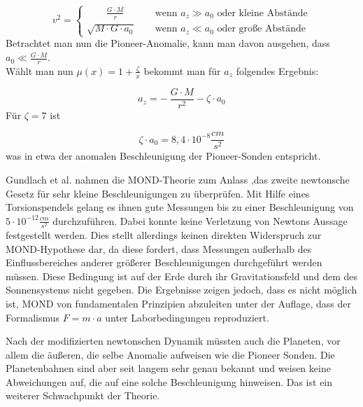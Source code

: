 \begin{equation*}
v^{2}=
\begin{cases}
\qquad \frac{G\cdot M}{r} \qquad \quad \, \textrm{wenn } a_{z}\gg a_{0} \textrm{ oder kleine Abst\"ande} \\
\sqrt{M\cdot G\cdot a_{0}} \qquad \textrm{wenn } a_{z}\ll a_{0} \textrm{ oder gro{\ss}e Abst\"ande}
\end{cases}
\end{equation*}
Betrachtet man nun die Pioneer-Anomalie, kann man davon
ausgehen, dass $a_{0}\ll \frac{G\cdot M}{r}$. \\
W\"ahlt man nun $\mu (x)=1+\frac{\zeta }{x}$ bekommt
man f\"ur $a_{z}$ folgendes Ergebnis:

\begin{equation}
a_{z}=-\ \frac{G\cdot M}{r^{2}}-\zeta \cdot a_{0}
\end{equation}
F\"ur $\zeta =7$ ist 

\begin{equation*}
\zeta \cdot a_{0}=8,4\cdot 10^{-8}\frac{\mathit{cm}}{s^{2}}
\end{equation*}
was in etwa der anomalen Beschleunigung der Pioneer-Sonden entspricht.


\bigskip


Gundlach et al.\cite{Grundlach2007} nahmen die MOND-Theorie zum Anlass ,das zweite
newtonsche Gesetz f\"ur sehr kleine Beschleunigungen zu \"uberpr\"ufen.
Mit Hilfe eines Torsionspendels gelang es ihnen gute Messungen bis zu
einer Beschleunigung von  $5\cdot 10^{-12}\frac{\mathit{cm}}{s^{2}}$
durchzuf\"uhren. Dabei konnte keine Verletzung von Newtons Aussage
festgestellt werden. Dies stellt allerdings keinen direkten Widerspruch
zur MOND-Hypothese dar, da diese fordert, dass Messungen au{\ss}erhalb
des Einflussbereiches anderer gr\"o{\ss}erer Beschleunigungen
durchgef\"uhrt werden m\"ussen. Diese Bedingung ist auf der Erde durch
ihr Gravitationsfeld und dem des Sonnensystems nicht gegeben. Die
Ergebnisse zeigen jedoch, dass es nicht m\"oglich ist, MOND von
fundamentalen Prinzipien abzuleiten unter der Auflage, dass der
Formalismus  $F=m\cdot a$  unter Laborbedingungen reproduziert.


Nach der modifizierten newtonschen Dynamik m\"ussten auch die Planeten,
vor allem die \"au{\ss}eren, die selbe Anomalie aufweisen wie die
Pioneer Sonden. Die Planetenbahnen sind aber seit langem sehr genau
bekannt und weisen keine Abweichungen auf, die auf eine solche
Beschleunigung hinweisen. Das ist ein weiterer Schwachpunkt der
Theorie.
